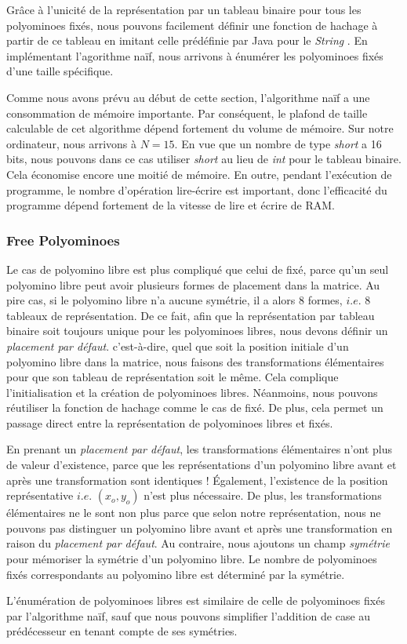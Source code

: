 \documentclass[a4paper,12pt]{article}
\begin{document}
	\par Grâce à l'unicité de la représentation par un tableau binaire pour tous les polyominoes fixés, nous pouvons facilement définir une fonction de hachage à partir de ce tableau en imitant celle prédéfinie par Java pour le \textit{String} . En implémentant l'agorithme naïf, nous arrivons à énumérer les polyominoes fixés d'une taille spécifique.
	\par Comme nous avons prévu au début de cette section, l'algorithme naïf a une consommation de mémoire importante. Par conséquent, le plafond de taille calculable de cet algorithme dépend fortement du volume de mémoire. Sur notre ordinateur, nous arrivons à $N=15$. En vue que un nombre de type \textit{short} a 16 bits, nous pouvons dans ce cas utiliser \textit{short} au lieu de \textit{int} pour le tableau binaire. Cela économise encore une moitié de mémoire. En outre, pendant l'exécution de programme, le nombre d'opération lire-écrire est important, donc l'efficacité du programme dépend fortement de la vitesse de lire et écrire de RAM.
	
	\subsubsection{Free Polyominoes}
	\par Le cas de polyomino libre est plus compliqué que celui de fixé, parce qu'un seul polyomino libre peut avoir plusieurs formes de placement dans la matrice. Au pire cas, si le polyomino libre n'a aucune symétrie, il a alors 8 formes, $i.e.$ 8 tableaux de représentation. De ce fait, afin que la représentation par tableau binaire soit toujours unique pour les polyominoes libres, nous devons définir un \textit{placement par défaut}. c'est-à-dire, quel que soit la position initiale d'un polyomino libre dans la matrice, nous faisons des transformations élémentaires pour que son tableau de représentation soit le même. Cela complique l'initialisation et la création de polyominoes libres. Néanmoins, nous pouvons réutiliser la fonction de hachage comme le cas de fixé. De plus, cela permet un passage direct entre la représentation de polyominoes libres et fixés.
	\par En prenant un \textit{placement par défaut}, les transformations élémentaires n'ont plus de valeur d'existence, parce que les représentations d'un polyomino libre avant et après une transformation sont identiques ! Également, l'existence de la position représentative $i.e.$ $(x_{o}, y_{o})$ n'est plus nécessaire. De plus, les transformations élémentaires ne le sont non plus parce que selon notre représentation, nous ne pouvons pas distinguer un polyomino libre avant et après une transformation en raison du \textit{placement par défaut}. Au contraire, nous ajoutons un champ \textit{symétrie} pour mémoriser la symétrie d'un polyomino libre. Le nombre de polyominoes fixés correspondants au polyomino libre est déterminé par la symétrie.
	\par L'énumération de polyominoes libres est similaire de celle de polyominoes fixés par l'algorithme naïf, sauf que nous pouvons simplifier l'addition de case au prédécesseur en tenant compte de ses symétries.
\end{document}
